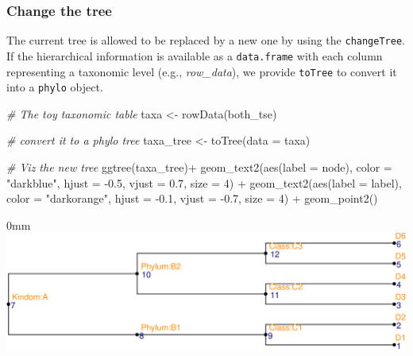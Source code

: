\documentclass[]{article}
\newcommand{\hlnum}[1]{\textcolor[rgb]{0.816,0.125,0.439}{#1}}%
\newcommand{\hlstr}[1]{\textcolor[rgb]{0.251,0.627,0.251}{#1}}%
\newcommand{\hlcom}[1]{\textcolor[rgb]{0.502,0.502,0.502}{\textit{#1}}}%
\newcommand{\hlopt}[1]{\textcolor[rgb]{0,0,0}{#1}}%
\newcommand{\hlstd}[1]{\textcolor[rgb]{0.251,0.251,0.251}{#1}}%
\newcommand{\hlkwc}[1]{\textcolor[rgb]{0.251,0.251,0.251}{#1}}%
\newcommand{\hlkwd}[1]{\textcolor[rgb]{0.878,0.439,0.125}{#1}}%
\newenvironment{Shaded}{\begin{myshaded}}{\end{myshaded}}
\newcommand{\KeywordTok}[1]{\hlkwd{#1}}
\newcommand{\DataTypeTok}[1]{\hlkwc{#1}}
\newcommand{\DecValTok}[1]{\hlnum{#1}}
\newcommand{\FloatTok}[1]{\hlnum{#1}}
\newcommand{\StringTok}[1]{\hlstr{#1}}
\newcommand{\CommentTok}[1]{\hlcom{#1}}
\newcommand{\OperatorTok}[1]{\hlopt{#1}}
\newcommand{\NormalTok}[1]{\hlstd{#1}}
\begin{document}
\hypertarget{change-the-tree}{%
\subsubsection{Change the tree}\label{change-the-tree}}

The current tree is allowed to be replaced by a new one by using the \texttt{changeTree}. If the hierarchical information is available as a \texttt{data.frame} with each column representing a taxonomic level (e.g., \emph{row\_data}), we provide \texttt{toTree} to convert it into a \texttt{phylo} object.

\begin{Shaded}
\begin{Highlighting}[]
\CommentTok{# The toy taxonomic table}
\NormalTok{taxa <-}\StringTok{ }\KeywordTok{rowData}\NormalTok{(both_tse)}

\CommentTok{# convert it to a phylo tree}
\NormalTok{taxa_tree <-}\StringTok{ }\KeywordTok{toTree}\NormalTok{(}\DataTypeTok{data =}\NormalTok{ taxa)}

\CommentTok{# Viz the new tree}
\KeywordTok{ggtree}\NormalTok{(taxa_tree)}\OperatorTok{+}
\KeywordTok{geom_text2}\NormalTok{(}\KeywordTok{aes}\NormalTok{(}\DataTypeTok{label =}\NormalTok{ node), }\DataTypeTok{color =} \StringTok{"darkblue"}\NormalTok{,}
                \DataTypeTok{hjust =} \FloatTok{-0.5}\NormalTok{, }\DataTypeTok{vjust =} \FloatTok{0.7}\NormalTok{, }\DataTypeTok{size =} \DecValTok{4}\NormalTok{) }\OperatorTok{+}
\KeywordTok{geom_text2}\NormalTok{(}\KeywordTok{aes}\NormalTok{(}\DataTypeTok{label =}\NormalTok{ label), }\DataTypeTok{color =} \StringTok{"darkorange"}\NormalTok{,}
            \DataTypeTok{hjust =} \FloatTok{-0.1}\NormalTok{, }\DataTypeTok{vjust =} \FloatTok{-0.7}\NormalTok{, }\DataTypeTok{size =} \DecValTok{4}\NormalTok{) }\OperatorTok{+}
\StringTok{    }\KeywordTok{geom_point2}\NormalTok{()}
\end{Highlighting}
\end{Shaded}

\begin{adjustwidth}{\fltoffset}{0mm}
\includegraphics{figure/unnamed-chunk-15-1} \end{adjustwidth}
\end{document}
